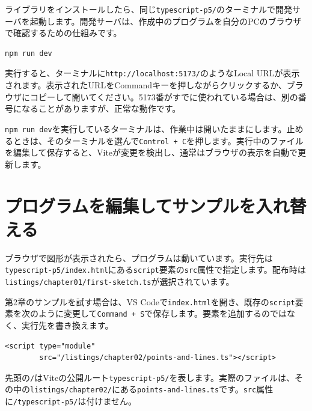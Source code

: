 ライブラリをインストールしたら、同じ\texttt{typescript-p5/}のターミナルで開発サーバを起動します。開発サーバは、作成中のプログラムを自分のPCのブラウザで確認するための仕組みです。

\begin{listing}[htbp]
\begin{verbatim}
npm run dev
\end{verbatim}
\caption{Viteの開発サーバを起動するコマンド}
\label{lst:appendix-macos-npm-run-dev}
\end{listing}

実行すると、ターミナルに\texttt{http://localhost:5173/}のようなLocal URLが表示されます。表示されたURLをCommandキーを押しながらクリックするか、ブラウザにコピーして開いてください。5173番がすでに使われている場合は、別の番号になることがありますが、正常な動作です。

\texttt{npm run dev}を実行しているターミナルは、作業中は開いたままにします。止めるときは、そのターミナルを選んで\texttt{Control + C}を押します。実行中のファイルを編集して保存すると、Viteが変更を検出し、通常はブラウザの表示を自動で更新します。

\section{プログラムを編集してサンプルを入れ替える}

ブラウザで図形が表示されたら、プログラムは動いています。実行先は\texttt{typescript-p5/index.html}にある\texttt{script}要素の\texttt{src}属性で指定します。配布時は\texttt{listings/chapter01/first-sketch.ts}が選択されています。

第2章のサンプルを試す場合は、VS Codeで\texttt{index.html}を開き、既存の\texttt{script}要素を次のように変更して\texttt{Command + S}で保存します。要素を追加するのではなく、実行先を書き換えます。

\begin{listing}[htbp]
\begin{verbatim}
<script type="module"
        src="/listings/chapter02/points-and-lines.ts"></script>
\end{verbatim}
\caption{第2章のサンプルを直接実行する指定}
\label{lst:appendix-macos-copy-sample}
\end{listing}

先頭の\texttt{/}はViteの公開ルート\texttt{typescript-p5/}を表します。実際のファイルは、その中の\texttt{listings/chapter02/}にある\texttt{points-and-lines.ts}です。\texttt{src}属性に\texttt{/typescript-p5/}は付けません。

